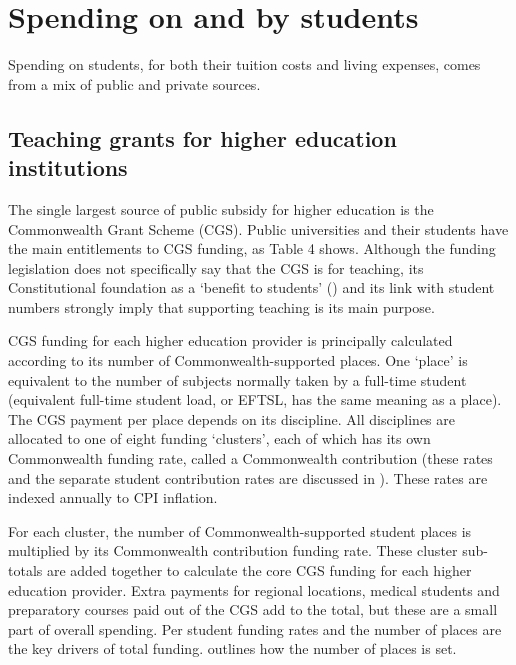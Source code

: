 \documentclass{grattan}
\begin{document}
%
\section{Spending on and by students}\label{sec:spending-on-and-by-students}

Spending on students, for both their tuition costs and living expenses, comes from a mix of public and private sources.

%
\subsection{Teaching grants for higher education institutions}\label{subsec:teaching-grants-for-higher-education-institutions}

The single largest source of public subsidy for higher education is the Commonwealth Grant Scheme (CGS). Public universities and their students have the main entitlements to CGS funding, as Table 4 shows. Although the funding legislation does not specifically say that the CGS is for teaching, its Constitutional foundation as a `benefit to students' () and its link with student numbers strongly imply that supporting teaching is its main purpose.

CGS funding for each higher education provider is principally calculated according to its number of Commonwealth-supported places. One `place' is equivalent to the number of subjects normally taken by a full-time student (equivalent full-time student load, or EFTSL, has the same meaning as a place). The CGS payment per place depends on its discipline. All disciplines are allocated to one of eight funding `clusters', each of which has its own Commonwealth funding rate, called a Commonwealth contribution (these rates and the separate student contribution rates are discussed in ). These rates are indexed annually to CPI inflation.

For each cluster, the number of Commonwealth-supported student places is multiplied by its Commonwealth contribution funding rate. These cluster sub-totals are added together to calculate the core CGS funding for each higher education provider. Extra payments for regional locations, medical students and preparatory courses paid out of the CGS add to the total, but these are a small part of overall spending. Per student funding rates and the number of places are the key drivers of total funding.  outlines how the number of places is set.
\end{document}
